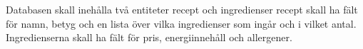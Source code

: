 Databasen skall inehålla två entiteter recept och ingredienser recept skall ha fält för namn, betyg och en lista över vilka ingredienser som ingår och i vilket antal. Ingredienserna skall ha fält för pris, energiinnehåll och allergener.
